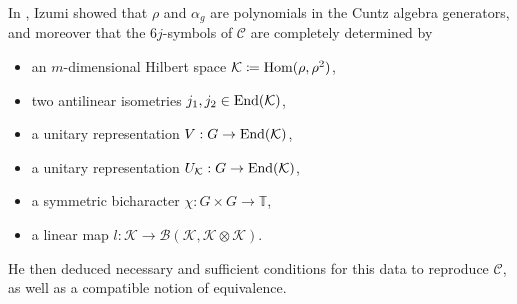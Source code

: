 \documentclass{beamer}
\begin{document}
\begin{frame}
In \cite{Izu17}, Izumi showed that $\rho$ and $\alpha_g$ are \textcolor{structure}{polynomials in the Cuntz algebra generators}, and moreover that the \textcolor{structure}{$6j$-symbols} of $\mathcal{C}$ are completely determined by\\[1.5ex]
\begin{itemize}
\item an $m$-dimensional Hilbert space $\mathcal{K} \coloneqq \textup{Hom}(\rho, \rho^2)$,\\[2ex]
\item two antilinear isometries $j_1, j_2 \in \textup{End}(\mathcal{K})$,\\[2ex]
\item a unitary representation $V : G \to \textup{End}(\mathcal{K})$,\\[2ex]
\item a unitary representation $U_\mathcal{K} : G \to \textup{End}(\mathcal{K})$,\\[2ex]
\item a symmetric bicharacter $\chi : G \times G \to \mathbb{T}$,\\[2ex]
\item a linear map $l : \mathcal{K} \to \mathcal{B}(\mathcal{K}, \mathcal{K} \otimes \mathcal{K})$.\\[2ex]
\end{itemize}
He then deduced necessary and sufficient conditions for this data to reproduce $\mathcal{C}$, as well as a compatible notion of equivalence.
\end{frame}
\end{document}
